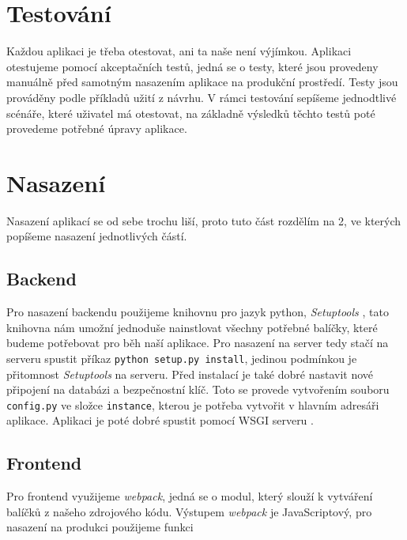 \section{Testování}

Každou aplikaci je třeba otestovat, ani ta naše není výjímkou. Aplikaci otestujeme pomocí akceptačních testů, jedná se o testy,
které jsou provedeny manuálně před samotným nasazením aplikace na produkční prostředí. Testy jsou prováděny podle příkladů užití z návrhu.
V rámci testování sepíšeme jednodtlivé scénáře, které uživatel má otestovat, na základně výsledků těchto testů poté provedeme potřebné
úpravy aplikace.

\section{Nasazení}

Nasazení aplikací se od sebe trochu liší, proto tuto část rozdělím na 2, ve kterých popíšeme nasazení jednotlivých částí.

\subsection{Backend}

Pro nasazení backendu použijeme knihovnu pro jazyk python, \textit{Setuptools} \cite{setupTools}, tato knihovna nám umožní
jednoduše nainstlovat všechny potřebné balíčky, které budeme potřebovat pro běh naší aplikace. Pro nasazení na server
tedy stačí na serveru spustit příkaz \texttt{python setup.py install}, jedinou podmínkou je přitomnost \textit{Setuptools}
na serveru. Před instalací je také dobré nastavit nové připojení na databázi a bezpečnostní klíč. Toto se provede vytvořením
souboru \texttt{config.py} ve složce \texttt{instance}, kterou je potřeba vytvořit v hlavním adresáři aplikace. Aplikaci je
poté dobré spustit pomocí WSGI serveru \cite{flaskDeploy}.


\subsection{Frontend}

Pro frontend využijeme \textit{webpack}, jedná se o modul, který slouží k vytváření balíčků z našeho zdrojového kódu. Výstupem
\textit{webpack} je JavaScriptový, pro nasazení na produkci použijeme funkci